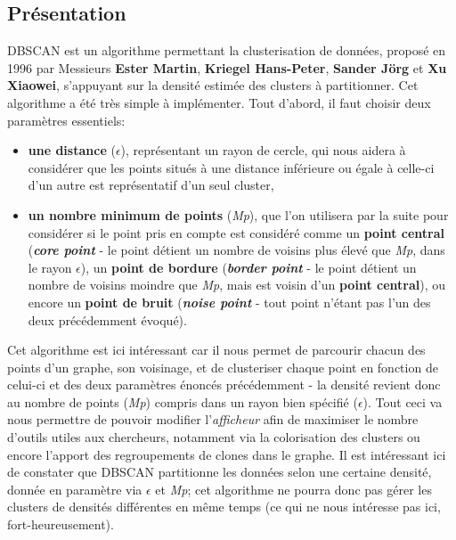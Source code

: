 \documentclass[12pt]{report}
\begin{document}
\begin{spacing}{1.2}
\subsection{Présentation}
DBSCAN est un algorithme permettant la clusterisation de données, proposé en 1996 par Messieurs \textbf{Ester Martin}, \textbf{Kriegel Hans-Peter}, \textbf{Sander Jörg} et \textbf{Xu Xiaowei}, s'appuyant sur la densité estimée des clusters à partitionner.
\newline
Cet algorithme a été très simple à implémenter.
\newline
Tout d'abord, il faut choisir deux paramètres essentiels:
\begin{itemize}
\item{\textbf{une distance} ($\epsilon$), représentant un rayon de cercle, qui nous aidera à considérer que les points situés à une distance inférieure ou égale à celle-ci d'un autre est représentatif d'un seul cluster},
\item{\textbf{un nombre minimum de points} (\textit{Mp}), que l'on utilisera par la suite pour considérer si le point pris en compte est considéré comme un \textbf{point central} (\textit{\textbf{core point}} - le point détient un nombre de voisins plus élevé que \textit{Mp}, dans le rayon $\epsilon$), un \textbf{point de bordure} (\textit{\textbf{border point}} - le point détient un nombre de voisins moindre que \textit{Mp}, mais est voisin d'un \textbf{point central}), ou encore un \textbf{point de bruit} (\textit{\textbf{noise point}} - tout point n'étant pas l'un des deux précédemment évoqué).}
\end{itemize}
Cet algorithme est ici intéressant car il nous permet de parcourir chacun des points d'un graphe, son voisinage, et de clusteriser chaque point en fonction de celui-ci et des deux paramètres énoncés précédemment - la densité revient donc au nombre de points (\textit{Mp}) compris dans un rayon bien spécifié ($\epsilon$). Tout ceci va nous permettre de pouvoir modifier l'\textit{afficheur} afin de maximiser le nombre d'outils utiles aux chercheurs, notamment via la colorisation des clusters ou encore l'apport des regroupements de clones dans le graphe.
\newline
Il est intéressant ici de constater que DBSCAN partitionne les données selon une certaine densité, donnée en paramètre via $\epsilon$ et \textit{Mp}; cet algorithme ne pourra donc pas gérer les clusters de densités différentes en même temps (ce qui ne nous intéresse pas ici, fort-heureusement).


\end{spacing}
\end{document}
